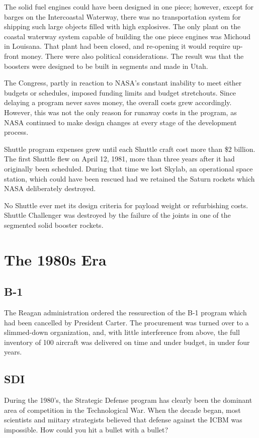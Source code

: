 The solid fuel engines could have been designed in one piece; however, except for barges on the Intercoastal Waterway, there was no transportation system for shipping such large objects filled with high explosives. The only plant on the coastal waterway system capable of building the one piece engines was Michoud in Louisana. That plant had been closed, and re-opening it would require up-front money. There were also political considerations. The result was that the boosters were designed to be built in segments and made in Utah.

The Congress, partly in reaction to NASA's constant inability to meet either budgets or schedules, imposed funding limits and budget stretchouts. Since delaying a program never saves money, the overall costs grew accordingly. However, this was not the only reason for runaway costs in the program, as NASA continued to make design changes at every stage of the development process.

Shuttle program expenses grew until each Shuttle craft cost more than \$2 billion. The first Shuttle flew on April 12, 1981, more than three years after it had originally been scheduled. During that time we lost Skylab, an operational space station, which could have been rescued had we retained the Saturn rockets which NASA deliberately destroyed.

No Shuttle ever met its design criteria for payload weight or refurbishing costs. Shuttle Challenger was destroyed by the failure of the joints in one of the segmented solid booster rockets.

\section{The 1980s Era}
\subsection{B-1}
The Reagan administration ordered the ressurection of the B-1 program which had been cancelled by President Carter. The procurement was turned over to a slimmed-down organization, and, with little interference from above, the full inventory of 100 aircraft was delivered on time and under budget, in under four years.

\subsection{SDI}
During the 1980's, the Strategic Defense program has clearly been the dominant area of competition in the Technological War. When the decade began, most scientists and miitary strategists believed that defense against the ICBM was impossible. How could you hit a bullet with a bullet?

